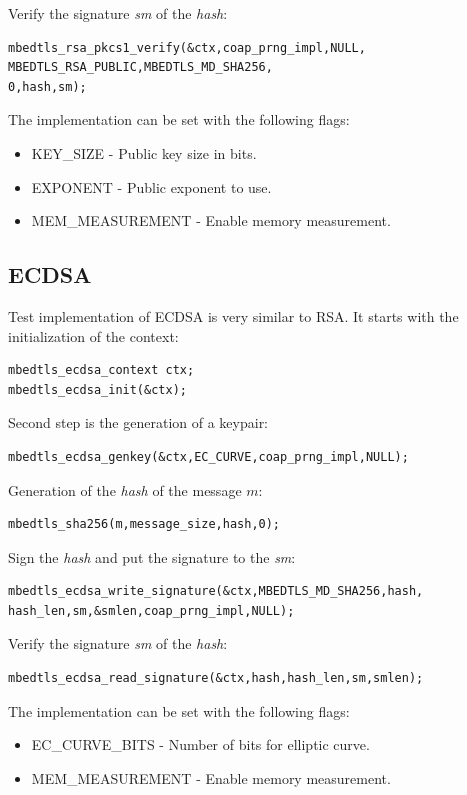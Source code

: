 \documentclass[thesis=M,english]{FITthesis}[2019/12/23]
\begin{document}
\noindent
Verify the signature \textit{sm} of the \textit{hash}:
\begin{lstlisting}[frame=single]
mbedtls_rsa_pkcs1_verify(&ctx,coap_prng_impl,NULL,
MBEDTLS_RSA_PUBLIC,MBEDTLS_MD_SHA256,
0,hash,sm);
\end{lstlisting}

\bigskip
\noindent
The implementation can be set with the following flags:
\begin{itemize}
\item	KEY\_SIZE - Public key size in bits.
\item EXPONENT - Public exponent to use.
\item MEM\_MEASUREMENT - Enable memory measurement.
\end{itemize}

\subsection{ECDSA}
Test implementation of ECDSA is very similar to RSA. It starts with the initialization of the context:
\begin{lstlisting}[frame=single]
mbedtls_ecdsa_context ctx;
mbedtls_ecdsa_init(&ctx);
\end{lstlisting}

\noindent
Second step is the generation of a keypair:
\begin{lstlisting}[frame=single]
mbedtls_ecdsa_genkey(&ctx,EC_CURVE,coap_prng_impl,NULL);
\end{lstlisting}

\noindent
Generation of the \textit{hash} of the message $m$:
\begin{lstlisting}[frame=single]
mbedtls_sha256(m,message_size,hash,0);
\end{lstlisting}

\noindent
Sign the \textit{hash} and put the signature to the \textit{sm}:
\begin{lstlisting}[frame=single]
mbedtls_ecdsa_write_signature(&ctx,MBEDTLS_MD_SHA256,hash,
hash_len,sm,&smlen,coap_prng_impl,NULL);
\end{lstlisting}

\noindent
Verify the signature \textit{sm} of the \textit{hash}:
\begin{lstlisting}[frame=single]
mbedtls_ecdsa_read_signature(&ctx,hash,hash_len,sm,smlen);
\end{lstlisting}

\bigskip
\noindent
The implementation can be set with the following flags:
\begin{itemize}
\item	EC\_CURVE\_BITS - Number of bits for elliptic curve.
\item MEM\_MEASUREMENT - Enable memory measurement.
\end{itemize}
\end{document}
